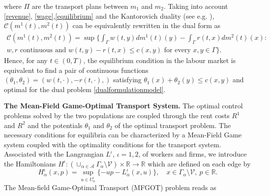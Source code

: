 \documentclass[smallextended,referee,envcountsect,]{svjour3}
\newcommand{\R}{{\mathbb{R}}}
\newcommand{\lra}{\longrightarrow}
\newcommand{\cA}{{\mathcal A}}
\newcommand{\cC}{{\mathcal C}}
\newcommand{\cV}{{\mathcal V}}
\renewcommand{\a}{{\alpha}}
\renewcommand{\th}{\theta}
\begin{document}
where $\Pi$ are the transport plans between $m_1$ and $m_2$.
Taking into account \eqref{revenue}, \eqref{wage},\eqref{equilibrium} and  the Kantorovich duality (see e.g. \cite{santambrogio,mugnolo,toledo}), $ \cC(m^1(t), m^2(t))$ can be equivalently rewritten in the dual form  as
\begin{align}
\label{dualformulationmodel}
\cC(m^1(t), m^2(t)) 
	 =\sup\Bigg\{ \int_{\Gamma}w(t, y)dm^1(t)(y)-\int_{\Gamma}r(t, x)dm^2(t)(x):\nonumber\\
	   \text{$w, r$ continuous and $w(t, y)-r(t, x)\leq c(x, y)$ for every }x, y\in\Gamma\Bigg\}.
\end{align}
Hence, for any $t\in(0,T)$, the equilibrium condition in the labour market is equivalent to find a pair of continuous functions $(\th_1,\th_2)=( w(t, \cdot), -r(t, \cdot),)$ satisfying $\th_1( x)+\th_2( y)\leq c(x, y)$ and optimal for the dual problem \eqref{dualformulationmodel}.
\par
\bigskip
\noindent
\textbf{The  Mean-Field Game-Optimal Transport System.} The optimal control problems solved by the two populations are  coupled through the rent costs $R^1$ and $R^2$  and the     potentials $\th_1$ and $\th_2$ of the optimal transport problem. The   necessary conditions for equilibria  can be characterized by a Mean-Field Game system coupled with the optimality conditions for the transport system.\\
Associated with the Langrangian $L^\iota$,  $\iota=1,2$, of workers and firms, we introduce the Hamiltonians $H^\iota:(\cup_{\a\in\cA}\Gamma_{\a}\setminus\cV)\times\R\lra\R$ which are defined on each edge by   
\begin{equation}\label{hamiltonian}
	H_\a^\iota(x, p)=\sup_{u \in U^\iota_{\a}}\{-up-L_\a^\iota(x, u)\},\quad x\in\Gamma_{\a}\setminus\cV,\ p\in\R.
\end{equation}
The Mean-field Game-Optimal Transport {(MFGOT)} problem reads as
\end{document}
